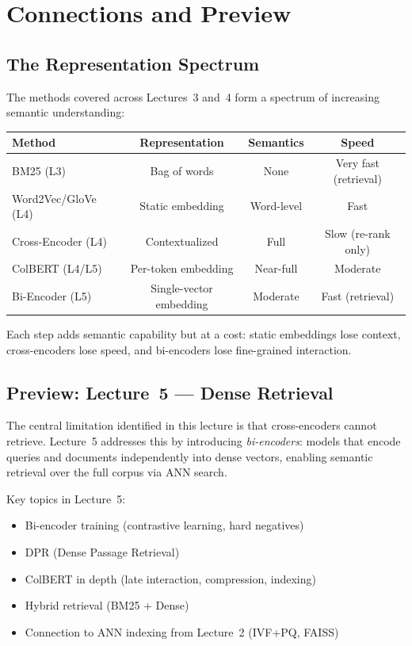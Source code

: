 \documentclass[11pt,a4paper]{article}
\theoremstyle{definition}
\theoremstyle{plain}
\begin{document}
\section{Connections and Preview}
\label{sec:connections}

\subsection{The Representation Spectrum}

The methods covered across Lectures~3 and~4 form a spectrum of increasing semantic understanding:

\begin{center}
\small
\begin{tabular}{lccc}
\toprule
\textbf{Method} & \textbf{Representation} & \textbf{Semantics} & \textbf{Speed} \\
\midrule
BM25 (L3) & Bag of words & None & Very fast (retrieval) \\
Word2Vec/GloVe (L4) & Static embedding & Word-level & Fast \\
Cross-Encoder (L4) & Contextualized & Full & Slow (re-rank only) \\
ColBERT (L4/L5) & Per-token embedding & Near-full & Moderate \\
Bi-Encoder (L5) & Single-vector embedding & Moderate & Fast (retrieval) \\
\bottomrule
\end{tabular}
\end{center}

Each step adds semantic capability but at a cost: static embeddings lose context, cross-encoders lose speed, and bi-encoders lose fine-grained interaction.

\subsection{Preview: Lecture~5 --- Dense Retrieval}

The central limitation identified in this lecture is that cross-encoders cannot retrieve. Lecture~5 addresses this by introducing \emph{bi-encoders}: models that encode queries and documents independently into dense vectors, enabling semantic retrieval over the full corpus via ANN search.

Key topics in Lecture~5:
\begin{itemize}
    \item Bi-encoder training (contrastive learning, hard negatives)
    \item DPR (Dense Passage Retrieval)~\cite{karpukhin2020dense}
    \item ColBERT in depth (late interaction, compression, indexing)
    \item Hybrid retrieval (BM25 + Dense)
    \item Connection to ANN indexing from Lecture~2 (IVF+PQ, FAISS)
\end{itemize}
\end{document}
